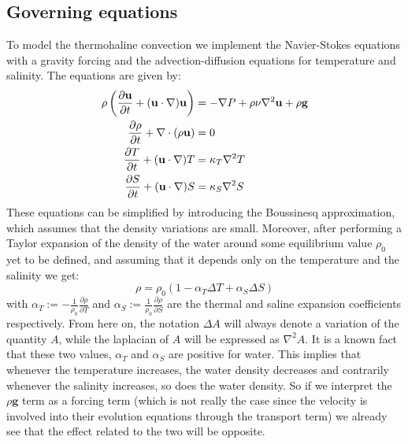 \documentclass{article}
\begin{document}
\subsection{Governing equations}
To model the thermohaline convection we implement the Navier-Stokes equations with a gravity forcing and the advection-diffusion equations for temperature and salinity. The equations are given by:
\begin{equation}
  \begin{aligned}
    \rho\left(\frac{\partial\mathbf{u}}{\partial t} + (\mathbf{u}\cdot\nabla)\mathbf{u}\right) & = -\nabla P + \rho\nu\nabla^2\mathbf{u} + \rho \mathbf{g} \\
    \pdv{\rho}{t} + \nabla\cdot(\rho\mathbf{u})                                                & = 0                                                       \\
    \frac{\partial T}{\partial t} + (\mathbf{u}\cdot\nabla)T                                   & = \kappa_T \nabla^2T                                      \\
    \frac{\partial S}{\partial t} + (\mathbf{u}\cdot\nabla)S                                   & = \kappa_S \nabla^2S                                      \\
  \end{aligned}
\end{equation}
These equations can be simplified by introducing the Boussinesq approximation, which assumes that the density variations are small. Moreover, after performing a Taylor expansion of the density of the water around some equilibrium value $\rho_0$ yet to be defined, and assuming that it depends only on the temperature and the salinity we get:
\begin{equation}
  \rho = \rho_0(1-\alpha_T\Delta T + \alpha_S\Delta S)
\end{equation}
with $\alpha_T:= -\frac{1}{\rho_0}\frac{\partial\rho}{\partial T}$ and $\alpha_S:= \frac{1}{\rho_0}\frac{\partial\rho}{\partial S}$ are the thermal and saline expansion coefficients respectively. From here on, the notation $\Delta A$ will always denote a variation of the quantity $A$, while the laplacian of $A$ will be expressed as $\nabla^2A$. It is a known fact that these two values, $\alpha_T$ and $\alpha_S$ are positive for water. This implies that whenever the temperature increases, the water density decreases and contrarily whenever the salinity increases, so does the water density. So if we interpret the $\rho\mathbf{g}$ term as a forcing term (which is not really the case since the velocity is involved into their evolution equations through the transport term) we already see that the effect related to the two will be opposite.
\end{document}

